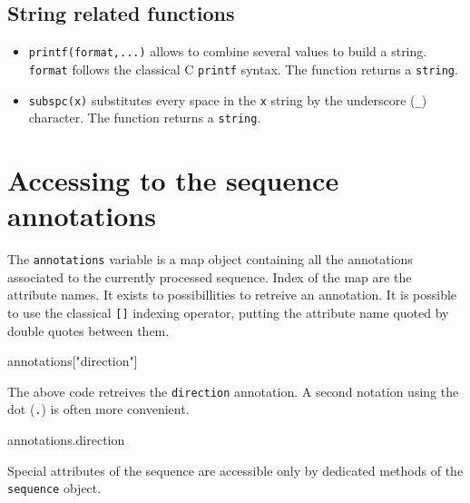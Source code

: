 \documentclass[
  letterpaper,
  DIV=11,
  numbers=noendperiod]{scrreprt}
\newenvironment{Shaded}{\begin{snugshade}}{\end{snugshade}}
\newcommand{\NormalTok}[1]{\textcolor[rgb]{0.00,0.23,0.31}{#1}}
\newcommand{\OperatorTok}[1]{\textcolor[rgb]{0.37,0.37,0.37}{#1}}
\newcommand{\StringTok}[1]{\textcolor[rgb]{0.13,0.47,0.30}{#1}}
\providecommand{\tightlist}{%
  \setlength{\itemsep}{0pt}\setlength{\parskip}{0pt}}\usepackage{longtable,booktabs,array}
\begin{document}
\hypertarget{string-related-functions}{%
\subsection*{String related functions}\label{string-related-functions}}

\begin{itemize}
\tightlist
\item
  \texttt{printf(format,...)} allows to combine several values to build
  a string. \texttt{format} follows the classical C \texttt{printf}
  syntax. The function returns a \texttt{string}.
\item
  \texttt{subspc(x)} substitutes every space in the \texttt{x} string by
  the underscore (\texttt{\_}) character. The function returns a
  \texttt{string}.
\end{itemize}

\hypertarget{accessing-to-the-sequence-annotations}{%
\section{Accessing to the sequence
annotations}\label{accessing-to-the-sequence-annotations}}

The \texttt{annotations} variable is a map object containing all the
annotations associated to the currently processed sequence. Index of the
map are the attribute names. It exists to possibillities to retreive an
annotation. It is possible to use the classical \texttt{{[}{]}} indexing
operator, putting the attribute name quoted by double quotes between
them.

\begin{Shaded}
\begin{Highlighting}[]
\NormalTok{annotations}\OperatorTok{[}\StringTok{"direction"}\OperatorTok{]}
\end{Highlighting}
\end{Shaded}

The above code retreives the \texttt{direction} annotation. A second
notation using the dot (\texttt{.}) is often more convenient.

\begin{Shaded}
\begin{Highlighting}[]
\NormalTok{annotations}\OperatorTok{.}\NormalTok{direction}
\end{Highlighting}
\end{Shaded}

Special attributes of the sequence are accessible only by dedicated
methods of the \texttt{sequence} object.
\end{document}
